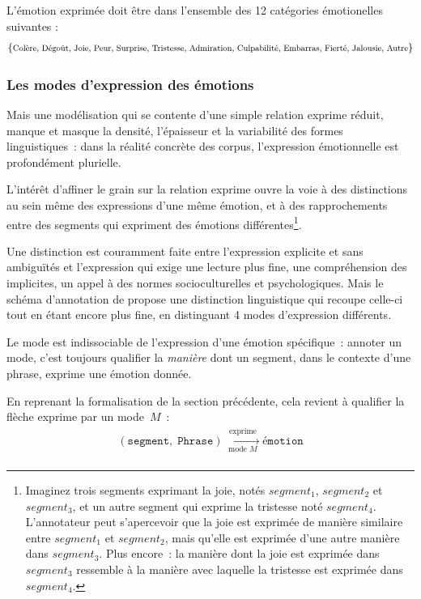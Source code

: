 \documentclass[french, 11pt]{article}
\begin{document}
L'émotion exprimée doit être dans l'ensemble des 12 catégories émotionelles suivantes : 
$$\{\text{\footnotesize Colère, Dégoût, Joie, Peur, Surprise, Tristesse, Admiration, Culpabilité, Embarras, Fierté, Jalousie, Autre}\}$$
\subsubsection*{Les modes d'expression des émotions}

Mais une modélisation qui se contente d'une simple relation \og exprime\fg{}
réduit, manque et masque la densité, l'épaisseur et la variabilité des
formes linguistiques~: dans la réalité concrète des corpus, l'expression
émotionnelle est profondément plurielle.

L'intérêt d'affiner le grain sur la relation \og exprime\fg{} ouvre la
voie à des distinctions au sein même des expressions d'une même émotion,
et à des rapprochements entre des segments qui expriment des émotions
différentes\footnote{Imaginez trois segments exprimant la joie, notés
$segment_1$, $segment_2$ et $segment_3$, et un autre segment qui exprime
la tristesse noté $segment_4$. L'annotateur peut s'apercevoir que la
joie est exprimée de manière similaire entre $segment_1$ et $segment_2$,
mais qu'elle est exprimée d'une autre manière dans $segment_3$. Plus
encore~: la manière dont la joie est exprimée dans $segment_3$ ressemble
à la manière avec laquelle la tristesse est exprimée dans $segment_4$.}.

Une distinction est couramment faite entre l'expression explicite et
sans ambiguïtés et l'expression qui exige une lecture plus fine, une
compréhension des implicites, un appel à des normes socioculturelles et
psychologiques. Mais le schéma d'annotation de \textcite{etienne2023}
propose une distinction linguistique qui recoupe celle-ci tout en étant
encore plus fine, en distinguant 4 modes d'expression différents.

Le mode est indissociable de l'expression d'une émotion spécifique~:
annoter un mode, c'est toujours qualifier la \emph{manière} dont un
segment, dans le contexte d'une phrase, exprime une émotion donnée. 


En reprenant la formalisation de la section précédente, cela revient à
qualifier la flèche \og exprime\fg{} par un mode~$M$~:
\begin{gather*}
(\texttt{segment},\;\texttt{Phrase})
  \xrightarrow[\;\text{mode } M\;]{\text{exprime}}
  \texttt{émotion}\\[2pt]
\end{gather*}
\end{document}

